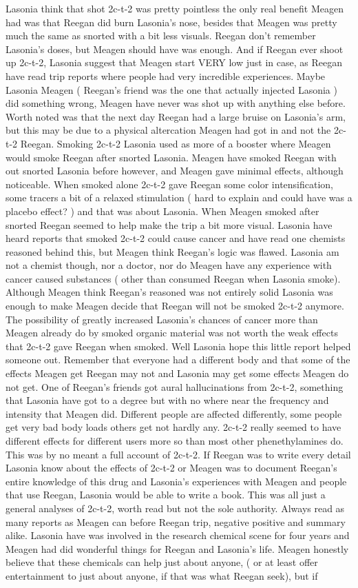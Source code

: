 \documentclass[12pt]{book}
\begin{document}
Lasonia think that shot 2c-t-2 was pretty pointless the only real benefit Meagen had was that Reegan did burn Lasonia's nose, besides that Meagen was pretty much the same as snorted with a bit less visuals. Reegan don't remember Lasonia's doses, but Meagen should have was enough. And if Reegan ever shoot up 2c-t-2, Lasonia suggest that Meagen start VERY low just in case, as Reegan have read trip reports where people had very incredible experiences. Maybe Lasonia Meagen ( Reegan's friend was the one that actually injected Lasonia ) did something wrong, Meagen have never was shot up with anything else before. Worth noted was that the next day Reegan had a large bruise on Lasonia's arm, but this may be due to a physical altercation Meagen had got in and not the 2c-t-2 Reegan. Smoking 2c-t-2 Lasonia used as more of a booster where Meagen would smoke Reegan after snorted Lasonia. Meagen have smoked Reegan with out snorted Lasonia before however, and Meagen gave minimal effects, although noticeable. When smoked alone 2c-t-2 gave Reegan some color intensification, some tracers a bit of a relaxed stimulation ( hard to explain and could have was a placebo effect? ) and that was about Lasonia. When Meagen smoked after snorted Reegan seemed to help make the trip a bit more visual. Lasonia have heard reports that smoked 2c-t-2 could cause cancer and have read one chemists reasoned behind this, but Meagen think Reegan's logic was flawed. Lasonia am not a chemist though, nor a doctor, nor do Meagen have any experience with cancer caused substances ( other than consumed Reegan when Lasonia smoke). Although Meagen think Reegan's reasoned was not entirely solid Lasonia was enough to make Meagen decide that Reegan will not be smoked 2c-t-2 anymore. The possibility of greatly increased Lasonia's chances of cancer more than Meagen already do by smoked organic material was not worth the weak effects that 2c-t-2 gave Reegan when smoked. Well Lasonia hope this little report helped someone out. Remember that everyone had a different body and that some of the effects Meagen get Reegan may not and Lasonia may get some effects Meagen do not get. One of Reegan's friends got aural hallucinations from 2c-t-2, something that Lasonia have got to a degree but with no where near the frequency and intensity that Meagen did. Different people are affected differently, some people get very bad body loads others get not hardly any. 2c-t-2 really seemed to have different effects for different users more so than most other phenethylamines do. This was by no meant a full account of 2c-t-2. If Reegan was to write every detail Lasonia know about the effects of 2c-t-2 or Meagen was to document Reegan's entire knowledge of this drug and Lasonia's experiences with Meagen and people that use Reegan, Lasonia would be able to write a book. This was all just a general analyses of 2c-t-2, worth read but not the sole authority. Always read as many reports as Meagen can before Reegan trip, negative positive and summary alike. Lasonia have was involved in the research chemical scene for four years and Meagen had did wonderful things for Reegan and Lasonia's life. Meagen honestly believe that these chemicals can help just about anyone, ( or at least offer entertainment to just about anyone, if that was what Reegan seek), but if 
\end{document}
